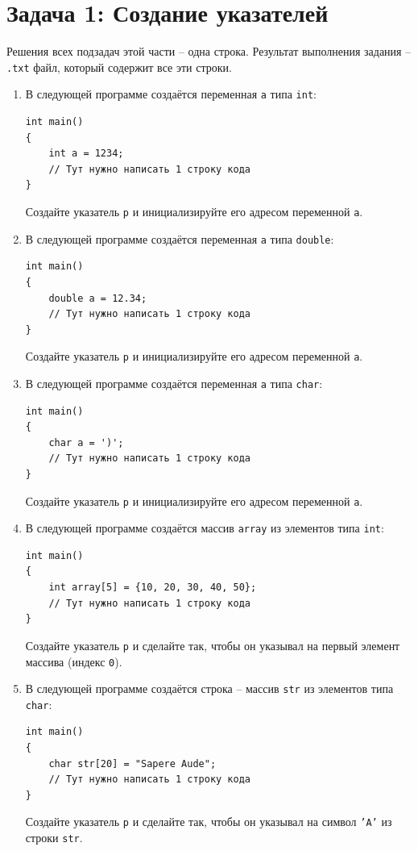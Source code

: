 \documentclass{article}
\begin{document}
\section*{Задача 1: Создание указателей}
Решения всех подзадач этой части -- одна строка. Результат выполнения задания -- \texttt{.txt} файл, который содержит все эти строки.
\begin{enumerate}
\item В следующей программе создаётся переменная \texttt{a} типа \texttt{int}:
\begin{lstlisting}
int main() 
{
    int a = 1234;
    // Тут нужно написать 1 строку кода
}
\end{lstlisting}
Создайте указатель \texttt{p} и инициализируйте его адресом переменной \texttt{a}.


\item В следующей программе создаётся переменная \texttt{a} типа \texttt{double}:
\begin{lstlisting}
int main() 
{
    double a = 12.34;
    // Тут нужно написать 1 строку кода
}
\end{lstlisting}
Создайте указатель \texttt{p} и инициализируйте его адресом переменной \texttt{a}.

\item В следующей программе создаётся переменная \texttt{a} типа \texttt{char}:
\begin{lstlisting}
int main() 
{
    char a = ')';
    // Тут нужно написать 1 строку кода
}
\end{lstlisting}
Создайте указатель \texttt{p} и инициализируйте его адресом переменной \texttt{a}.

\item В следующей программе создаётся массив \texttt{array} из элементов типа \texttt{int}:
\begin{lstlisting}
int main() 
{
    int array[5] = {10, 20, 30, 40, 50};
    // Тут нужно написать 1 строку кода
}
\end{lstlisting}
Создайте указатель \texttt{p} и сделайте так, чтобы он указывал на первый элемент массива (индекс \texttt{0}).


\item В следующей программе создаётся строка -- массив \texttt{str} из элементов типа \texttt{char}:
\begin{lstlisting}
int main() 
{
    char str[20] = "Sapere Aude";
    // Тут нужно написать 1 строку кода
}
\end{lstlisting}
Создайте указатель \texttt{p} и сделайте так, чтобы он указывал на символ \texttt{'A'}  из строки \texttt{str}.


\end{enumerate}
\end{document}
